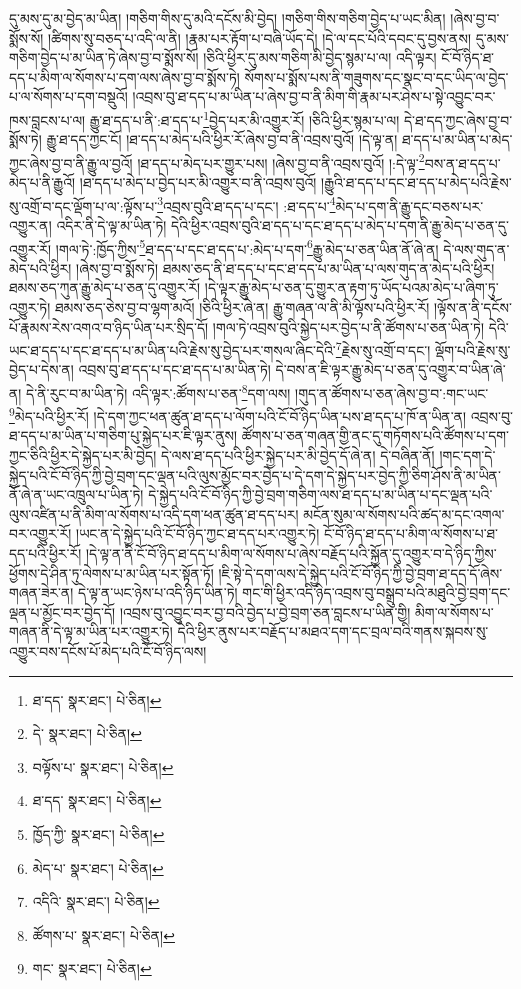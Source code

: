 དུ་མས་དུ་མ་བྱེད་མ་ཡིན། །གཅིག་གིས་དུ་མའི་དངོས་མི་བྱེད། །གཅིག་གིས་གཅིག་བྱེད་པ་ཡང་མིན། །ཞེས་བྱ་བ་སྨོས་སོ། །ཚིགས་སུ་བཅད་པ་འདི་ལ་ནི། །རྣམ་པར་རྟོག་པ་བཞི་ཡོད་དེ། །དེ་ལ་དང་པོའི་དབང་དུ་བྱས་ནས། དུ་མས་གཅིག་བྱེད་པ་མ་ཡིན་ཏེ་ཞེས་བྱ་བ་སྨོས་སོ། །ཅིའི་ཕྱིར་དུ་མས་གཅིག་མི་བྱེད་སྙམ་པ་ལ། འདི་ལྟར། ངོ་བོ་ཉིད་ཐ་དད་པ་མིག་ལ་སོགས་པ་དག་ལས་ཞེས་བྱ་བ་སྨོས་ཏེ། སོགས་པ་སྨོས་པས་ནི་གཟུགས་དང་སྣང་བ་དང་ཡིད་ལ་བྱེད་པ་ལ་སོགས་པ་དག་བསྡུའོ། །འབྲས་བུ་ཐ་དད་པ་མ་ཡིན་པ་ཞེས་བྱ་བ་ནི་མིག་གི་རྣམ་པར་ཤེས་པ་སྟེ་འབྱུང་བར་ཁས་བླངས་པ་ལ། རྒྱུ་ཐ་དད་པ་ནི་:ཐ་དད་པ་\footnote{ཐ་དད་  སྣར་ཐང་།  པེ་ཅིན། }བྱེད་པར་མི་འགྱུར་རོ། །ཅིའི་ཕྱིར་སྙམ་པ་ལ། དེ་ཐ་དད་ཀྱང་ཞེས་བྱ་བ་སྨོས་ཏེ། རྒྱུ་ཐ་དད་ཀྱང་ངོ། །ཐ་དད་པ་མེད་པའི་ཕྱིར་རོ་ཞེས་བྱ་བ་ནི་འབྲས་བུའོ། །དེ་ལྟ་ན། ཐ་དད་པ་མ་ཡིན་པ་མེད་ཀྱང་ཞེས་བྱ་བ་ནི་རྒྱུ་ལ་བྱའོ། །ཐ་དད་པ་མེད་པར་གྱུར་པས། །ཞེས་བྱ་བ་ནི་འབྲས་བུའོ། །:དེ་ལྟ་\footnote{དེ་  སྣར་ཐང་།  པེ་ཅིན། }བས་ན་ཐ་དད་པ་མེད་པ་ནི་རྒྱུའོ། །ཐ་དད་པ་མེད་པ་བྱེད་པར་མི་འགྱུར་བ་ནི་འབྲས་བུའོ། །རྒྱུའི་ཐ་དད་པ་དང་ཐ་དད་པ་མེད་པའི་རྗེས་སུ་འགྲོ་བ་དང་ལྡོག་པ་ལ་:ལྟོས་པ་\footnote{བལྟོས་པ་  སྣར་ཐང་།  པེ་ཅིན། }འབྲས་བུའི་ཐ་དད་པ་དང་། :ཐ་དད་པ་\footnote{ཐ་དད་  སྣར་ཐང་།  པེ་ཅིན། }མེད་པ་དག་ནི་རྒྱུ་དང་བཅས་པར་འགྱུར་ན། འདིར་ནི་དེ་ལྟ་མ་ཡིན་ཏེ། དེའི་ཕྱིར་འབྲས་བུའི་ཐ་དད་པ་དང་ཐ་དད་པ་མེད་པ་དག་ནི་རྒྱུ་མེད་པ་ཅན་དུ་འགྱུར་རོ། །གལ་ཏེ་:ཁྱོད་ཀྱིས་\footnote{ཁྱོད་ཀྱི་  སྣར་ཐང་།  པེ་ཅིན། }ཐ་དད་པ་དང་ཐ་དད་པ་:མེད་པ་དག་\footnote{མེད་པ་  སྣར་ཐང་།  པེ་ཅིན། }རྒྱུ་མེད་པ་ཅན་ཡིན་ནོ་ཞེ་ན། དེ་ལས་གུད་ན་མེད་པའི་ཕྱིར། །ཞེས་བྱ་བ་སྨོས་ཏེ། ཐམས་ཅད་ནི་ཐ་དད་པ་དང་ཐ་དད་པ་མ་ཡིན་པ་ལས་གུད་ན་མེད་པའི་ཕྱིར། ཐམས་ཅད་ཀུན་རྒྱུ་མེད་པ་ཅན་དུ་འགྱུར་རོ། །དེ་ལྟར་རྒྱུ་མེད་པ་ཅན་དུ་གྱུར་ན་རྟག་ཏུ་ཡོད་པའམ་མེད་པ་ཞིག་ཏུ་འགྱུར་ཏེ། ཐམས་ཅད་ཅེས་བྱ་བ་ལྷག་མའོ། །ཅིའི་ཕྱིར་ཞེ་ན། རྒྱུ་གཞན་ལ་ནི་མི་ལྟོས་པའི་ཕྱིར་རོ། །ལྟོས་ན་ནི་དངོས་པོ་རྣམས་རེས་འགའ་བ་ཉིད་ཡིན་པར་སྲིད་དོ། །གལ་ཏེ་འབྲས་བུའི་སྐྱེད་པར་བྱེད་པ་ནི་ཚོགས་པ་ཅན་ཡིན་ཏེ། དེའི་ཡང་ཐ་དད་པ་དང་ཐ་དད་པ་མ་ཡིན་པའི་རྗེས་སུ་བྱེད་པར་གསལ་ཞིང་དེའི་\footnote{འདིའི་  སྣར་ཐང་།  པེ་ཅིན། }རྗེས་སུ་འགྲོ་བ་དང་། ལྡོག་པའི་རྗེས་སུ་བྱེད་པ་དེས་ན། འབྲས་བུ་ཐ་དད་པ་དང་ཐ་དད་པ་མ་ཡིན་ཏེ། དེ་བས་ན་ཇི་ལྟར་རྒྱུ་མེད་པ་ཅན་དུ་འགྱུར་བ་ཡིན་ཞེ་ན། དེ་ནི་རུང་བ་མ་ཡིན་ཏེ། འདི་ལྟར་:ཚོགས་པ་ཅན་\footnote{ཚོགས་པ་  སྣར་ཐང་།  པེ་ཅིན། }དག་ལས། །གུད་ན་ཚོགས་པ་ཅན་ཞེས་བྱ་བ་:གང་ཡང་\footnote{གང་  སྣར་ཐང་།  པེ་ཅིན། }མེད་པའི་ཕྱིར་རོ། །དེ་དག་ཀྱང་ཕན་ཚུན་ཐ་དད་པ་ལོག་པའི་ངོ་བོ་ཉིད་ཡིན་པས་ཐ་དད་པ་ཁོ་ན་ཡིན་ན། འབྲས་བུ་ཐ་དད་པ་མ་ཡིན་པ་གཅིག་པུ་སྐྱེད་པར་ཇི་ལྟར་ནུས། ཚོགས་པ་ཅན་གཞན་གྱི་ནང་དུ་གཏོགས་པའི་ཚོགས་པ་དག་ཀྱང་ཅིའི་ཕྱིར་དེ་སྐྱེད་པར་མི་བྱེད། དེ་ལས་ཐ་དད་པའི་ཕྱིར་སྐྱེད་པར་མི་བྱེད་དོ་ཞེ་ན། དེ་བཞིན་ནོ། །གང་དག་དེ་སྐྱེད་པའི་ངོ་བོ་ཉིད་ཀྱི་བྱེ་བྲག་དང་ལྡན་པའི་ལུས་མྱོང་བར་བྱེད་པ་དེ་དག་དེ་སྐྱེད་པར་བྱེད་ཀྱི་ཅིག་ཤོས་ནི་མ་ཡིན་ནོ་ཞེ་ན་ཡང་འཁྲུལ་པ་ཡིན་ཏེ། དེ་སྐྱེད་པའི་ངོ་བོ་ཉིད་ཀྱི་བྱེ་བྲག་གཅིག་ལས་ཐ་དད་པ་མ་ཡིན་པ་དང་ལྡན་པའི་ལུས་འཛིན་པ་ནི་མིག་ལ་སོགས་པ་འདི་དག་ཕན་ཚུན་ཐ་དད་པར། མངོན་སུམ་ལ་སོགས་པའི་ཚད་མ་དང་འགལ་བར་འགྱུར་རོ། །ཡང་ན་དེ་སྐྱེད་པའི་ངོ་བོ་ཉིད་ཀྱང་ཐ་དད་པར་འགྱུར་ཏེ། ངོ་བོ་ཉིད་ཐ་དད་པ་མིག་ལ་སོགས་པ་ཐ་དད་པའི་ཕྱིར་རོ། །དེ་ལྟ་ན་ནི་ངོ་བོ་ཉིད་ཐ་དད་པ་མིག་ལ་སོགས་པ་ཞེས་བརྗོད་པའི་སྐྱོན་དུ་འགྱུར་བ་དེ་ཉིད་ཀྱིས་ཕྱོགས་དེ་ཤིན་ཏུ་ལེགས་པ་མ་ཡིན་པར་སྟོན་ཏོ། །ཇི་སྟེ་དེ་དག་ལས་དེ་སྐྱེད་པའི་ངོ་བོ་ཉིད་ཀྱི་བྱེ་བྲག་ཐ་དད་དོ་ཞེས་གཞན་ཟེར་ན། དེ་ལྟ་ན་ཡང་ཉེས་པ་འདི་ཉིད་ཡིན་ཏེ། གང་གི་ཕྱིར་འདི་ཉིད་འབྲས་བུ་བསྒྲུབ་པའི་མཐུའི་བྱེ་བྲག་དང་ལྡན་པ་མྱོང་བར་བྱེད་དོ། །འབྲས་བུ་འབྱུང་བར་བྱ་བའི་བྱེད་པ་བྱེ་བྲག་ཅན་བླངས་པ་ཡིན་གྱི། མིག་ལ་སོགས་པ་གཞན་ནི་དེ་ལྟ་མ་ཡིན་པར་འགྱུར་ཏེ། དེའི་ཕྱིར་ནུས་པར་བརྗོད་པ་མཐའ་དག་དང་བྲལ་བའི་གནས་སྐབས་སུ་འགྱུར་བས་དངོས་པོ་མེད་པའི་ངོ་བོ་ཉིད་ལས། 